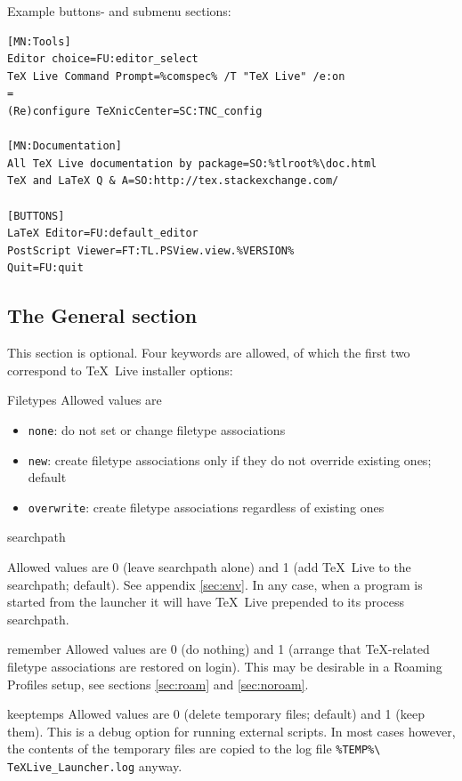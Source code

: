 \documentclass[11pt,a4paper,oneside]{report}
\def\TL{\TeX~Live}
\def\dbr{\discretionary{}{}{}}
\let\bsl\textbackslash
\def\bslb{\bsl\discretionary{}{}{}}
\newenvironment{ttdesc}{%
  \def\descriptionlabel##1{\hspace\labelsep\ttfamily\selectfont ##1}%
  \description}{\enddescription}
\begin{document}
{\sloppy
Example buttons- and submenu sections:
\begin{verbatim}
[MN:Tools]
Editor choice=FU:editor_select
TeX Live Command Prompt=%comspec% /T "TeX Live" /e:on
=
(Re)configure TeXnicCenter=SC:TNC_config

[MN:Documentation]
All TeX Live documentation by package=SO:%tlroot%\doc.html
TeX and LaTeX Q & A=SO:http://tex.stackexchange.com/

[BUTTONS]
LaTeX Editor=FU:default_editor
PostScript Viewer=FT:TL.PSView.view.%VERSION%
Quit=FU:quit
\end{verbatim}
\par}

\subsection{The General section}
\label{sec:gen}

This section is optional. Four keywords are allowed, of which the
first two correspond to \TL{} installer options:
\begin{ttdesc}
\item[Filetypes] Allowed values are
  \begin{itemize}
  \item \texttt{none}: do not set or change filetype associations
  \item \texttt{new}: create filetype associations only if they do
    not override existing ones; default
  \item \texttt{overwrite}: create filetype associations regardless
    of existing ones
  \end{itemize}
\item[searchpath] {\sloppy Allowed values are 0 (leave searchpath
    alone) and 1 (add \TL{} to the searchpath; default). See
    appendix \ref{sec:env}. In any case, when a program is started
    from the launcher it will have \TL{} prepended to its process
    searchpath.\par}
\item[remember] Allowed values are 0 (do nothing) and 1 (arrange
  that \TeX-related filetype associations are restored on
  login). This may be desirable in a Roaming Profiles setup, see
  sections \ref{sec:roam} and \ref{sec:noroam}.
\item[keeptemps] Allowed values are 0 (delete temporary files;
  default) and 1 (keep them). This is a debug option for running
  external scripts. In most cases however, the contents of the
  temporary files are copied to the log file \texttt{\%TEMP\%\bslb
    TeXLive\_\dbr Launcher.log} anyway.
\end{ttdesc}
\end{document}
